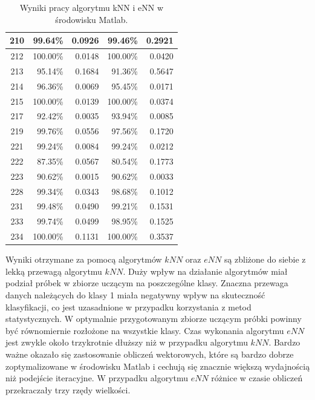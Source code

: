 \begin{table}[H]
\begin{tabular}{|c|r|r|r|r|}
\hline
210 & 99.64\% & 0.0926 & 99.46\% & 0.2921 \\ 
\hline
212 & 100.00\% & 0.0148 & 100.00\% & 0.0420 \\ 
\hline
213 & 95.14\% & 0.1684 & 91.36\% & 0.5647 \\ 
\hline
214 & 96.36\% & 0.0069 & 95.45\% & 0.0171 \\ 
\hline
215 & 100.00\% & 0.0139 & 100.00\% & 0.0374 \\ 
\hline
217 & 92.42\% & 0.0035 & 93.94\% & 0.0085 \\ 
\hline
219 & 99.76\% & 0.0556 & 97.56\% & 0.1720 \\ 
\hline
221 & 99.24\% & 0.0084 & 99.24\% & 0.0212 \\ 
\hline
222 & 87.35\% & 0.0567 & 80.54\% & 0.1773 \\ 
\hline
223 & 90.62\% & 0.0015 & 90.62\% & 0.0033 \\ 
\hline
228 & 99.34\% & 0.0343 & 98.68\% & 0.1012 \\ 
\hline
231 & 99.48\% & 0.0490 & 99.21\% & 0.1531 \\ 
\hline
233 & 99.74\% & 0.0499 & 98.95\% & 0.1525 \\ 
\hline
234 & 100.00\% & 0.1131 & 100.00\% & 0.3537 \\ 
\hline

		
	\end{tabular}
	\caption{Wyniki pracy algorytmu kNN i eNN w środowisku Matlab.}
	\label{tab:matlab-skutecznosc}
	
\end{table}

Wyniki otrzymane za pomocą algorytmów $kNN$ oraz $eNN$ są zbliżone do siebie z lekką przewagą algorytmu $kNN$. Duży wpływ na działanie algorytmów miał podział próbek w zbiorze uczącym na poszczególne klasy. Znaczna przewaga danych należących do klasy 1 miała negatywny wpływ na skuteczność klasyfikacji, co jest uzasadnione w przypadku korzystania z metod statystycznych. W optymalnie przygotowanym zbiorze uczącym próbki powinny być równomiernie rozłożone na wszystkie klasy. Czas wykonania algorytmu $eNN$ jest zwykle około trzykrotnie dłuższy niż w przypadku algorytmu $kNN$. Bardzo ważne okazało się zastosowanie obliczeń wektorowych, które są bardzo dobrze zoptymalizowane w środowisku Matlab i cechują się znacznie większą wydajnością niż podejście iteracyjne. W przypadku algorytmu $eNN$ różnice w czasie obliczeń przekraczały trzy rzędy wielkości.